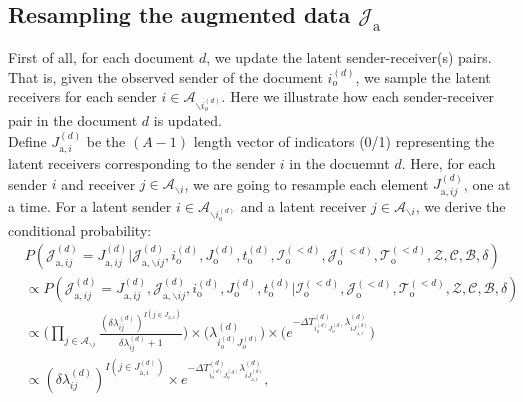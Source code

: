 \documentclass[a4paper]{article}
\begin{document}
    \subsection{Resampling the augmented data $\mathcal{J}_{\mbox{a}}$} \label{subsec: Data augmentation}
      First of all, for each document $d$, we update the latent sender-receiver(s) pairs. That is, given the observed sender of the document $i_o^{(d)}$, we sample the latent receivers for each sender $i \in \mathcal{A}_{\backslash i_o^{(d)}}$. Here we illustrate how each sender-receiver pair in the document $d$ is updated.\\\newline
      Define ${J}^{(d)}_{\mbox{a}, i}$ be the $(A-1)$ length vector of indicators (0/1) representing the latent receivers corresponding to the sender $i$ in the docuemnt $d$. Here, for each sender $i$ and receiver  $j \in \mathcal{A}_{\backslash i}$, we are going to resample each element ${J}^{(d)}_{\mbox{a}, ij}$, one at a time. For a latent sender $i \in \mathcal{A}_{\backslash i_o^{(d)}}$ and a latent receiver $j \in \mathcal{A}_{\backslash i}$, we derive the conditional probability:\\
      \begin{equation}
      \begin{aligned}
      &P(\mathcal{J}^{(d)}_{\mbox{a}, ij} = {J}^{(d)}_{\mbox{a}, ij}|\mathcal{J}^{(d)}_{\mbox{a}, \backslash ij},   i^{(d)}_{\mbox{o}}, J^{(d)}_{\mbox{o}}, t^{(d)}_{\mbox{o}}, \mathcal{I}^{(<d)}_{\mbox{o}}, \mathcal{J}^{(<d)}_{\mbox{o}}, \mathcal{T}^{(<d)}_{\mbox{o}}, \mathcal{Z}, \mathcal{C}, \mathcal{B}, \delta)\\&\propto P(\mathcal{J}^{(d)}_{\mbox{a}, ij} ={J}^{(d)}_{\mbox{a}, ij},  \mathcal{J}^{(d)}_{\mbox{a}, \backslash ij},i^{(d)}_{\mbox{o}}, J^{(d)}_{\mbox{o}}, t^{(d)}_{\mbox{o}}| \mathcal{I}^{(<d)}_{\mbox{o}}, \mathcal{J}^{(<d)}_{\mbox{o}}, \mathcal{T}^{(<d)}_{\mbox{o}}, \mathcal{Z}, \mathcal{C}, \mathcal{B}, \delta)
      \\&\propto \Big(\prod_{j \in \mathcal{A}_{\backslash i }} \frac{(\delta\lambda^{(d)}_{ij})^{I(j \in J_{\mbox{a}, i})}}{\delta\lambda^{(d)}_{ij}+1}\Big)\times \Big(\lambda^{(d)}_{i_o^{(d)}J_{o}^{(d)}}\Big)\times  \Big(e^{-\Delta T^{(d)}_{i_o^{(d)}J_o^{(d)}}\lambda^{(d)}_{iJ^{(d)}_{\mbox{a}, i}}}\Big)\\&  \propto {(\delta\lambda^{(d)}_{ij})^{I(j \in J^{(d)}_{\mbox{a}, i})}}\times  e^{-\Delta T^{(d)}_{i_o^{(d)}J_o^{(d)}}\lambda^{(d)}_{iJ^{(d)}_{\mbox{a}, i}}},
      \end{aligned}
      \end{equation}
\end{document}
